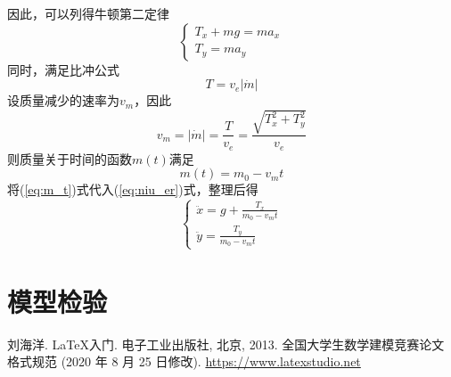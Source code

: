 \documentclass[withoutpreface,bwprint]{cumcmthesis} %
\begin{document}
    因此，可以列得牛顿第二定律
    \begin{equation}
        \begin{cases}
            T_x + mg = m a_x \\
            T_y = m a_y
            \label{eq:niu_er}
        \end{cases}
    \end{equation}
    同时，满足比冲公式
    \begin{equation*}
        T = v_e |\dot{m}|
    \end{equation*}
    设质量减少的速率为$v_m$，因此
    \begin{equation}
        \boxed{
            v_m = |\dot{m}| = \frac{T}{v_e} = \frac{\sqrt{T_x^2 + T_y^2}}{v_e}
        }
    \end{equation}
    则质量关于时间的函数$m(t)$满足
    \begin{equation}
        m(t) = m_0 - v_m t
        \label{eq:m_t}
    \end{equation}
    将(\ref{eq:m_t})式代入(\ref{eq:niu_er})式，整理后得
    \begin{equation}
        \begin{cases}
            \ddot{x} = g + \frac{T_x}{m_0 - v_m t} \\
            \ddot{y} = \frac{T_y}{m_0 - v_m t}
        \end{cases}
    \end{equation}
    
    \section{模型检验}

    \begin{thebibliography}{9}%
        刘海洋.
        \newblock \LaTeX {}入门\allowbreak[J].
        \newblock 电子工业出版社, 北京, 2013.
        全国大学生数学建模竞赛论文格式规范 (2020 年 8 月 25 日修改).
         \url{https://www.latexstudio.net}
    \end{thebibliography}

    \newpage
    \begin{appendices}
    \end{appendices}
\end{document}
